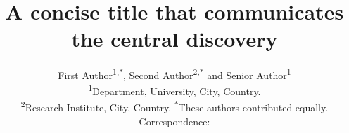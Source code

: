\title{A concise title that communicates the central discovery}
\author{%
  First Author\textsuperscript{1,*}, Second Author\textsuperscript{2,*}
  and Senior Author\textsuperscript{1}\\[6pt]
  {\small
    \textsuperscript{1}Department, University, City, Country.\\
    \textsuperscript{2}Research Institute, City, Country.\endgraf}
  \smallskip
  {\footnotesize
    \textsuperscript{*}These authors contributed equally.\\
    Correspondence: \endgraf}}
\date{}
